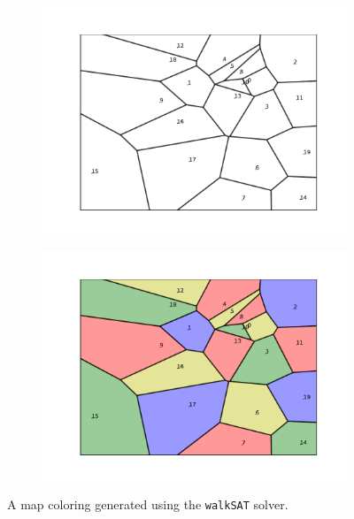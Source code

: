 \documentclass{article}
\begin{document}
    \vspace{-2mm}
    \begin{figure}[H]
        \centering
        \begin{subfigure}{0.49\textwidth}
            \centering
            \includegraphics[scale = .5]{sp23/hw-supplements/hw3-supp/images/blank_map.pdf}
        \end{subfigure}
        \begin{subfigure}{0.49\textwidth}
            \centering
            \includegraphics[scale = .5]{sp23/hw-supplements/hw3-supp/images/colored_map.pdf}
        \end{subfigure}
        \caption{A map coloring generated using the \lstinline{walkSAT} solver.}
        \label{fig:walkSAT}
    \end{figure}
\end{document}
